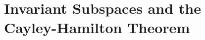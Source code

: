\section{Invariant Subspaces and the Cayley-Hamilton Theorem}\label{sec:5.4}

\exercisesection

\begin{ex}\label{ex:5.4.32}

\end{ex}
